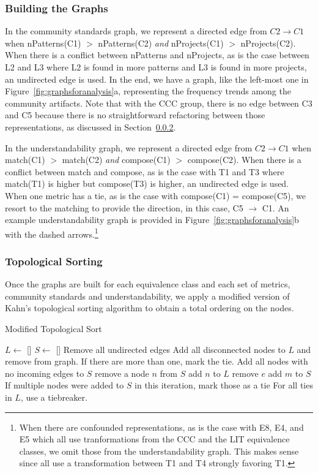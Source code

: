 \subsubsection{Building the Graphs}
In the community standards graph, we represent a directed edge from $C2 \rightarrow C1$ when  nPatterns(C1) $>$ nPatterns(C2) \emph{and}  nProjects(C1) $>$ nProjects(C2). When there is a conflict between nPatterns and nProjects, as is the case between L2 and L3 where L2 is found in more patterns and L3 is found in more projects, an undirected edge is used. In the end, we have a graph, like the left-most one in Figure~\ref{fig:graphsforanalysis}a, representing the frequency trends among the community artifacts. Note that with the CCC group, there is no edge between C3 and C5 because there is no straightforward refactoring between those representations, as discussed in Section~\ref{}.

In the understandability graph, we represent a directed edge from $C2 \rightarrow C1$ when match(C1) $>$ match(C2) \emph{and} compose(C1) $>$ compose(C2). When there is a conflict between match and compose, as is the case with T1 and T3 where match(T1) is higher but compose(T3) is higher, an undirected edge is used. When one metric has a tie, as is the case with compose(C1) = compose(C5), we resort to the matching to provide the direction, in this case, C5 $\rightarrow$ C1. An example understandability graph is provided in Figure~\ref{fig:graphsforanalysis}b with the dashed arrows.\footnote{When there are confounded representations, as is the case with E8, E4, and E5 which all use tranformations from the CCC and the LIT equivalence classes, we omit those from the understandability graph. This makes sense since all use a transformation between T1 and T4 strongly favoring T1. }

\subsubsection{Topological Sorting}
Once the graphs are built for each equivalence class and each set of metrics, community standards and understandability, we apply a modified version of Kahn's topological sorting algorithm to obtain a total ordering on the nodes.

\begin{algorithm}
  \caption{Modified Topological Sort}\label{topological}
  \begin{algorithmic}[1]
\State  $L \gets$ []
\State $S \gets$ []
\State Remove all undirected edges
\State Add all disconnected nodes to $L$ and remove from graph. If there are more than one, mark the tie. \label{markTie1}
\State Add all nodes with no incoming edges to $S$
	\State remove a node $n$ from $S$ \label{setn}
	\State add $n$ to $L$
		\State remove $e$
			\State add $m$ to $S$ \label{addToS}
		\EndIf
	\EndFor
	\State If multiple nodes were added to $S$ in this iteration, mark those as a tie \label{markTie2}
\EndWhile
\State For all ties in $L$, use a tiebreaker.
  \end{algorithmic}
\end{algorithm}

